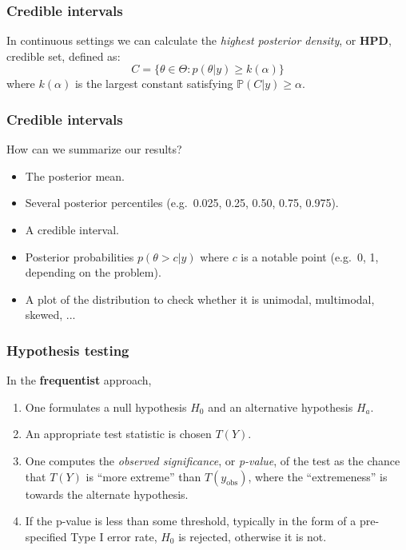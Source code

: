 \documentclass{beamer}
\renewcommand{\P}{\mathbb{P}}
\newcommand{\1}{\ensuremath{\mathbf{1}}}
\begin{document}
\begin{frame}\frametitle{Credible intervals}
	In continuous settings we can calculate the \emph{highest posterior density}, or \textbf{HPD}, credible set, defined as:
	\begin{equation}
		C = \{\theta \in \Theta : p(\theta|y) \geq k(\alpha)\}
	\end{equation}
	where $k(\alpha)$ is the largest constant satisfying $\P(C|y) \geq \alpha$.\\[2ex]
\end{frame}
%
%
%
\begin{frame}\frametitle{Credible intervals}
	How can we summarize our results?
	\begin{itemize}
		\item The posterior mean.
		\item Several posterior percentiles (e.g.\ 0.025, 0.25, 0.50, 0.75, 0.975).
		\item A credible interval.
		\item Posterior probabilities $p(\theta > c|y)$ where $c$ is a notable point (e.g.\ 0, 1, depending on the problem).
		\item A plot of the distribution to check whether it is unimodal, multimodal, skewed, ...
	\end{itemize}
\end{frame}
%
%
%
\begin{frame}\frametitle{Hypothesis testing}
	In the \textbf{frequentist} approach,
	\begin{enumerate}
		\item One formulates a null hypothesis $H_0$ and an alternative hypothesis $H_a$.
		\item An appropriate test statistic is chosen $T (Y )$.
		\item One computes the \emph{observed significance}, or \emph{p-value}, of the test as the chance that $T(Y)$ is ``more extreme'' than $T(y_\text{obs})$, where the ``extremeness'' is towards the alternate hypothesis.
		\item If the p-value is less than some threshold, typically in the form of a pre-specified Type I error rate, $H_0$ is rejected, otherwise it is not.
	\end{enumerate}
\end{frame}
\end{document}
